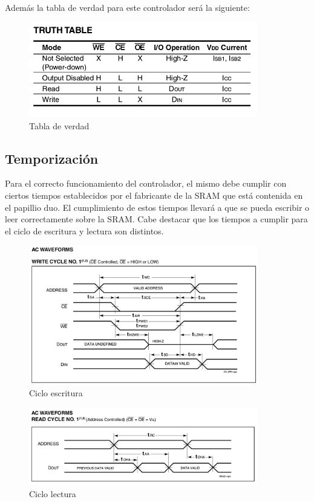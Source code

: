 \documentclass[10pt]{article}
\begin{document}
Además la tabla de verdad para este controlador será la siguiente:

\begin{figure}[hbtp]
\centering
\includegraphics[width=10cm]{truth-table.png}
\caption{Tabla de verdad}
\label{tab1}
\end{figure}

\newpage

\subsection*{Temporización}

Para el correcto funcionamiento del controlador, el mismo debe cumplir con ciertos tiempos establecidos por el fabricante de la SRAM que está contenida en el papillio duo. El cumplimiento de estos tiempos llevará a que se pueda escribir o leer correctamente sobre la SRAM.
Cabe destacar que los tiempos a cumplir para el ciclo de escritura y lectura son distintos.

\begin{figure}[hbtp]
\centering
\includegraphics[width=10cm]{write-form.png}
\caption{Ciclo escritura}
\label{Cic1}
\end{figure}

\begin{figure}[hbtp]
\centering
\includegraphics[width=10cm]{read-form.png}
\caption{Ciclo lectura}
\label{Cic2}
\end{figure}
\end{document}
